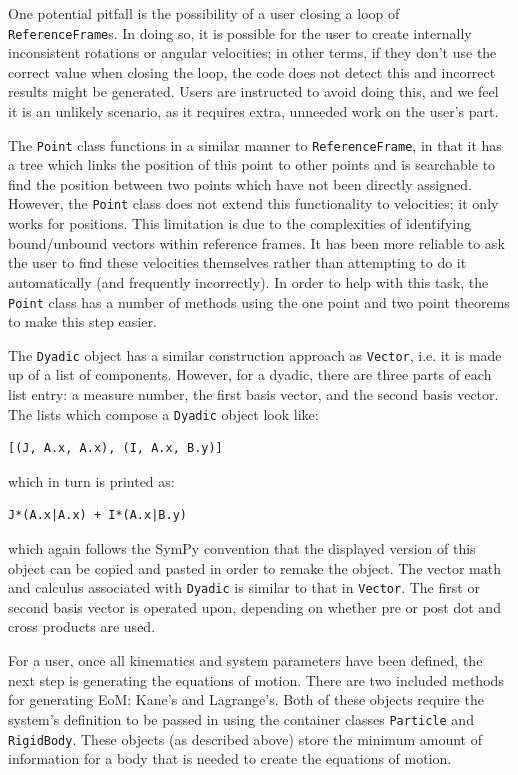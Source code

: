 \documentclass[twocolumn,10pt, final]{asme2e}
\begin{document}
One potential pitfall is the possibility of a user closing a loop of
\verb|ReferenceFrame|s.
In doing so, it is possible for the user to create internally inconsistent
rotations or angular velocities; in other terms, if they don't use the correct
value when closing the loop, the code does not detect this and incorrect
results might be generated.
Users are instructed to avoid doing this, and we feel it is an unlikely
scenario, as it requires extra, unneeded work on the user's part.

The \verb|Point| class functions in a similar manner to \verb|ReferenceFrame|,
in that it has a tree which links the position of this point to other points
and is searchable to find the position between two points which have not been
directly assigned.
However, the \verb|Point| class does not extend this functionality to
velocities; it only works for positions.
This limitation is due to the complexities of identifying bound/unbound vectors within
reference frames.
It has been more reliable to ask the user to find these velocities themselves
rather than attempting to do it automatically (and frequently incorrectly).
In order to help with this task, the \verb|Point| class has a number of methods
using the one point and two point theorems \cite{Kane1985} to make this step
easier.

The \verb|Dyadic| object has a similar construction approach as \verb|Vector|,
i.e. it is made up of a list of components.
However, for a dyadic, there are three parts of each list entry: a measure number,
the first basis vector, and the second basis vector.
The lists which compose a \verb|Dyadic| object look like:
\begin{verbatim}
[(J, A.x, A.x), (I, A.x, B.y)]
\end{verbatim}
which in turn is printed as:
\begin{verbatim}
J*(A.x|A.x) + I*(A.x|B.y)
\end{verbatim}
which again follows the SymPy convention that the displayed version of this
object can be copied and pasted in order to remake the object.
The vector math and calculus associated with \verb|Dyadic| is similar to that
in \verb|Vector|. The first or second basis vector is operated upon, depending
on whether pre or post dot and cross products are used.

For a user, once all kinematics and system parameters have been defined, the
next step is generating the equations of motion.
There are two included methods for generating EoM: Kane's and Lagrange's.
Both of these objects require the system's definition to be passed in using the
container classes \verb|Particle| and \verb|RigidBody|.
These objects (as described above) store the minimum amount of information for
a body that is needed to create the equations of motion.
\end{document}
